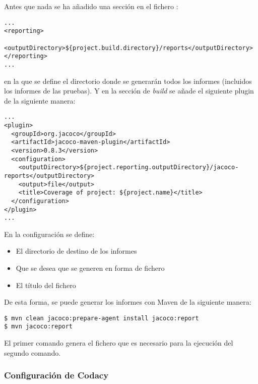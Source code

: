 Antes que nada se ha añadido una sección en el fichero :\\
\begin{minipage}{\linewidth}
{\tiny
\begin{lstlisting}[breaklines]
...
<reporting>
  <outputDirectory>${project.build.directory}/reports</outputDirectory>
</reporting>
...
\end{lstlisting}
}
\end{minipage}
en la que se define el directorio donde se generarán todos los informes (incluidos los informes de las pruebas). Y en la sección de \textit{build} se añade el siguiente plugin de la siguiente manera:\\
\begin{minipage}{\linewidth}
{\tiny
\begin{lstlisting}[breaklines]
...
<plugin>
  <groupId>org.jacoco</groupId>
  <artifactId>jacoco-maven-plugin</artifactId>
  <version>0.8.3</version>
  <configuration>
	<outputDirectory>${project.reporting.outputDirectory}/jacoco-reports</outputDirectory>
	<output>file</output>
	<title>Coverage of project: ${project.name}</title>
  </configuration>
</plugin>
...
\end{lstlisting}
}
\end{minipage}
En la configuración se define:
\begin{itemize}
	\tightlist
	\item El directorio de destino de los informes
	\item Que se desea que se generen en forma de fichero
	\item El título del fichero
\end{itemize}
 De esta forma, se puede generar los informes con Maven de la siguiente manera:\\
\begin{minipage}{\linewidth}
{\tiny
\begin{lstlisting}[breaklines]
$ mvn clean jacoco:prepare-agent install jacoco:report
$ mvn jacoco:report
\end{lstlisting}
}
\end{minipage}

El primer comando genera el fichero  que es necesario para la ejecución del segundo comando.

\subsubsection{Configuración de Codacy}

